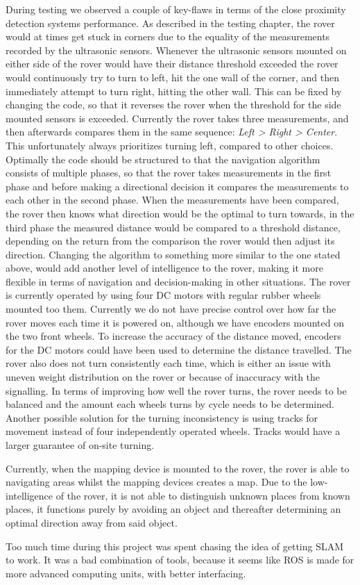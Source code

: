 During testing we observed a couple of key-flaws in terms of the close proximity detection systems performance.
As described in the testing chapter, the rover would at times get stuck in corners due to the equality of the measurements recorded by the ultrasonic sensors. Whenever the ultrasonic sensors mounted on either side of the rover would have their distance threshold exceeded the rover would continuously try to turn to left, hit the one wall of the corner, and then immediately attempt to turn right, hitting the other wall. This can be fixed by changing the code, so that it reverses the rover when the threshold for the side mounted sensors is exceeded. Currently the rover takes three measurements, and then afterwards compares them in the same sequence: \textit{Left > Right > Center}. This unfortunately always prioritizes turning left, compared to other choices. Optimally the code should be structured to that the navigation algorithm consists of multiple phases, so that the rover takes measurements in the first phase and before making a directional decision it compares the measurements to each other in the second phase. When the measurements have been compared, the rover then knows what direction would be the optimal to turn towards, in the third phase the measured distance would be compared to a threshold distance, depending on the return from the comparison the rover would then adjust its direction.
Changing the algorithm to something more similar to the one stated above, would add another level of intelligence to the rover, making it more flexible in terms of navigation and decision-making in other situations.
The rover is currently operated by using four DC motors with regular rubber wheels mounted too them. Currently we do not have precise control over how far the rover moves each time it is powered on, although we have encoders mounted on the two front wheels. To increase the accuracy of the distance moved, encoders for the DC motors could have been used to determine the distance travelled. The rover also does not turn consistently each time, which is either an issue with uneven weight distribution on the rover or because of inaccuracy with the signalling. In terms of improving how well the rover turns, the rover needs to be balanced and the amount each wheels turns by cycle needs to be determined. Another possible solution for the turning inconsistency is using tracks for movement instead of four independently operated wheels. Tracks would have a larger guarantee of on-site turning.

Currently, when the mapping device is mounted to the rover, the rover is able to navigating areas whilst the mapping devices creates a map. Due to the low-intelligence of the rover, it is not able to distinguish unknown places from known places, it functions purely by avoiding an object and thereafter determining an optimal direction away from said object.

Too much time during this project was spent chasing the idea of getting SLAM to work. It was a bad combination of tools, because it seems like ROS is made for more advanced computing units, with better interfacing.